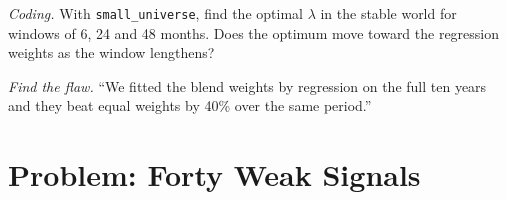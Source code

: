 \begin{exercise}[$\star\star\star$]\label{exo:rs:signal-combination:7}
\emph{Coding.} With \texttt{small\_universe}, find the optimal $\lambda$ in the stable world for windows of 6, 24 and 48 months. Does the optimum move
toward the regression weights as the window lengthens?
\end{exercise}

\begin{exercise}[$\star\star\star$]\label{exo:rs:signal-combination:8}
\emph{Find the flaw.} ``We fitted the blend weights by regression on the full ten years and they beat equal weights by 40\% over the same period.''
\end{exercise}

\section{Problem: Forty Weak Signals}


